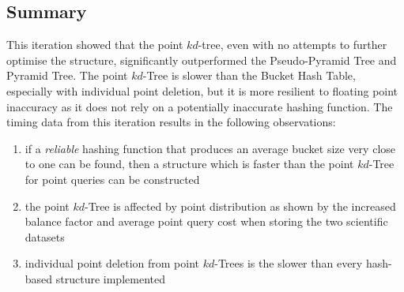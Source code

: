 \subsection{Summary}

This iteration showed that the point $kd$-tree, even with no attempts to further optimise the structure, significantly outperformed the Pseudo-Pyramid Tree and Pyramid Tree. The point $kd$-Tree is slower than the Bucket Hash Table, especially with individual point deletion, but it is more resilient to floating point inaccuracy as it does not rely on a potentially inaccurate hashing function. The timing data from this iteration results in the following observations:
\begin{enumerate}[noitemsep]
	\item if a \textit{reliable} hashing function that produces an average bucket size very close to one can be found, then a structure which is faster than the point $kd$-Tree for point queries can be constructed
	\item the point $kd$-Tree is affected by point distribution as shown by the increased balance factor and average point query cost when storing the two scientific datasets
	\item individual point deletion from point $kd$-Trees is the slower than every hash-based structure implemented
\end{enumerate}

